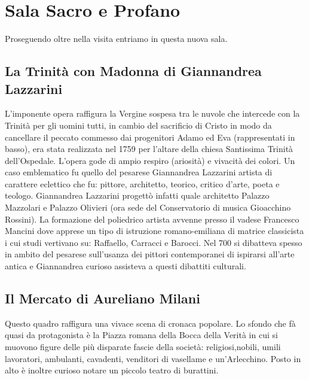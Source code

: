 \documentclass[12pt,a4paper]{article}
\begin{document}
	\section{Sala Sacro e Profano}
	Proseguendo oltre nella visita entriamo in questa nuova sala.
	\subsection{La Trinità con Madonna di Giannandrea Lazzarini}
	L'imponente opera raffigura la Vergine sospesa tra le nuvole che intercede con la Trinità per gli uomini tutti, in cambio del sacrificio di Cristo in modo da cancellare il peccato commesso dai progenitori Adamo ed Eva (rappresentati in basso), era stata realizzata nel 1759 per l'altare della chiesa Santissima Trinità dell'Ospedale. L'opera gode di ampio respiro (ariosità) e vivacità dei colori. Un caso emblematico fu quello del pesarese Giannandrea Lazzarini artista di carattere eclettico che fu: pittore, architetto, teorico, critico d'arte, poeta e teologo.
	Giannandrea Lazzarini progettò infatti quale architetto Palazzo Mazzolari e Palazzo Olivieri (ora sede del Conservatorio di musica Gioacchino Rossini). La formazione del poliedrico artista avvenne presso il vadese Francesco Mancini dove apprese un tipo di istruzione romano-emiliana di matrice classicista i cui studi vertivano su: Raffaello, Carracci e Barocci. Nel 700 si dibatteva spesso in ambito del pesarese sull'usanza dei pittori contemporanei di ispirarsi all'arte antica e Giannandrea curioso assisteva a questi dibattiti culturali.
	\subsection{Il Mercato di Aureliano Milani}
	Questo quadro raffigura una vivace scena di cronaca popolare. Lo sfondo che fà quasi da protagonista è la Piazza romana della Bocca della Verità in cui si muovono figure delle più disparate fascie della società: religiosi,nobili, umili lavoratori, ambulanti, cavadenti, venditori di vasellame e un'Arlecchino. Posto in alto è inoltre curioso notare un piccolo teatro di burattini.
	
	
\end{document}

